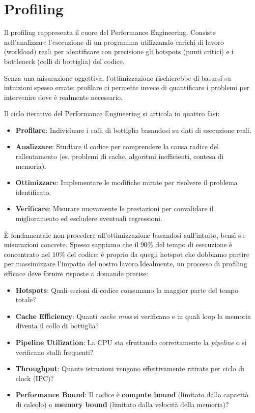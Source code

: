 \section{Profiling}
Il profiling rappresenta il cuore del Performance Engineering. Consiste nell'analizzare l'esecuzione di un programma utilizzando carichi di lavoro (workload) reali per identificare con precisione gli hotspots (punti critici) e i bottleneck (colli di bottiglia) del codice.

Senza una misurazione oggettiva, l'ottimizzazione rischierebbe di basarsi su intuizioni spesso errate; profilare ci permette invece di quantificare i problemi per intervenire dove è realmente necessario.

Il ciclo iterativo del Performance Engineering si articola in quattro fasi:
\begin{itemize}
    \item \textbf{Profilare}: Individuare i colli di bottiglia basandosi su dati di esecuzione reali.
    \item \textbf{Analizzare}: Studiare il codice per comprendere la causa radice del rallentamento (es. problemi di cache, algoritmi inefficienti, contesa di memoria).
    \item \textbf{Ottimizzare}: Implementare le modifiche mirate per risolvere il problema identificato.
    \item \textbf{Verificare}: Misurare nuovamente le prestazioni per convalidare il miglioramento ed escludere eventuali regressioni.
\end{itemize}

È fondamentale non procedere all'ottimizzazione basandosi sull'intuito, bensì su misurazioni concrete. Spesso sappiamo che il $90\%$ del tempo di esecuzione è concentrato nel $10\%$ del codice: è proprio da quegli hotspot che dobbiamo partire per massimizzare l'impatto del nostro lavoro.Idealmente, un processo di profiling efficace deve fornire risposte a domande precise:
\begin{itemize}
    \item \textbf{Hotspots}: Quali sezioni di codice consumano la maggior parte del tempo totale?
    \item \textbf{Cache Efficiency}: Quanti \textit{cache miss} si verificano e in quali loop la memoria diventa il collo di bottiglia?
    \item \textbf{Pipeline Utilization}: La CPU sta sfruttando correttamente la \textit{pipeline} o si verificano stalli frequenti?
    \item \textbf{Throughput}: Quante istruzioni vengono effettivamente ritirate per ciclo di clock (IPC)?
    \item \textbf{Performance Bound}: Il codice è \textbf{compute bound} (limitato dalla capacità di calcolo) o \textbf{memory bound} (limitato dalla velocità della memoria)?
\end{itemize}
